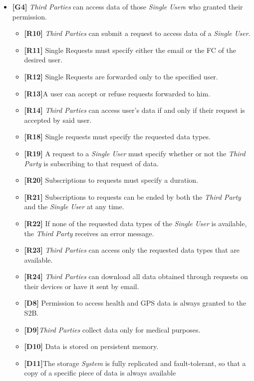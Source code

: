 \documentclass[titlepage]{article}
\begin{document}
\begin{itemize}
\begin{itemize}
					\end{itemize}
   				 \item {\bf [G4]} {\it Third Parties} can access data of those {\it Single User}s who granted their permission.
				 \begin{itemize} %
				 	\item {\bf [R10]} {\it Third Parties} can submit a request to access data of a {\it Single User}. 
\item {\bf [R11]} Single Requests must specify either the email or the FC of the desired user.
\item {\bf [R12]} Single Requests are forwarded only to the specified user. 
\item {\bf [R13]}A user can accept or refuse requests forwarded to him. 
\item {\bf [R14]} {\it Third Parties} can access user’s data if and only if their request is accepted by said user. 
\item {\bf [R18]} Single requests must specify the requested data types. 
\item {\bf [R19]} A request to a {\it Single User} must specify whether or not the {\it Third Party} is subscribing to that request of data.
\item {\bf [R20]} Subscriptions to requests must specify a duration.
\item {\bf [R21]} Subscriptions to requests can be ended by both the {\it Third Party} and the {\it Single User} at any time.
\item {\bf [R22]} If none of the requested data types of the {\it Single User} is available, the {\it Third Party} receives an error message.
\item {\bf [R23]} {\it Third Parties} can access only the requested data types that are available.
\item {\bf [R24]} {\it Third Parties} can download all data obtained through requests on their devices or have it sent by email.
\item {\bf [D8]} Permission to access health and GPS data is always granted to the S2B.
\item {\bf [D9]}{\it Third Parties} collect data only for medical purposes.
\item {\bf [D10]} Data is stored on persistent memory. 
\item {\bf [D11]}The storage {\it System} is fully replicated and fault-tolerant, so that a copy of a specific piece of data is always available
					 
					\end{itemize}


\end{itemize}
\end{document}
